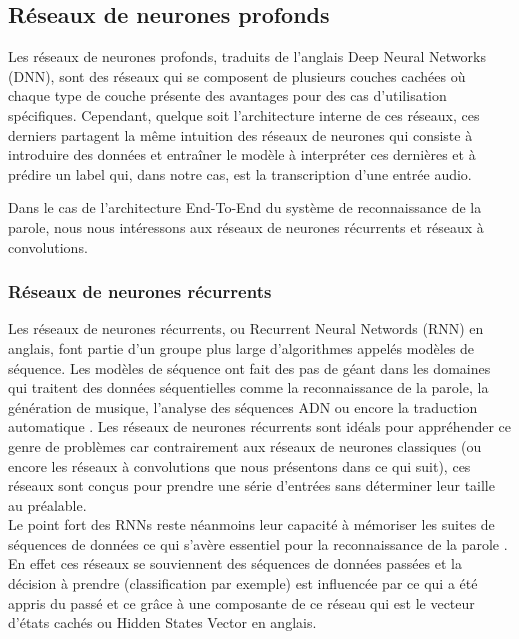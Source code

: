 \subsection{Réseaux de neurones profonds}
Les réseaux de neurones profonds, traduits de l'anglais Deep Neural Networks (DNN), sont des réseaux qui se composent de plusieurs couches cachées où chaque type de couche présente des avantages pour des cas d'utilisation spécifiques. Cependant, quelque soit l'architecture interne de ces réseaux, ces derniers partagent la même intuition des réseaux de neurones qui consiste à introduire des données et entraîner le modèle à interpréter ces dernières et à prédire un label qui, dans notre cas, est la transcription d'une entrée audio.

Dans le cas de l'architecture End-To-End du système de reconnaissance de la parole, nous nous intéressons aux réseaux de neurones récurrents et réseaux à convolutions.

\subsubsection{Réseaux de neurones récurrents}
Les réseaux de neurones récurrents, ou Recurrent Neural Networds (RNN) en anglais, font partie d'un groupe plus large d'algorithmes appelés modèles de séquence. Les modèles de séquence ont fait des pas de géant dans les domaines qui traitent des données séquentielles comme la reconnaissance de la parole, la génération de musique, l'analyse des séquences ADN ou encore la traduction automatique \cite{rnntowardsdata}. Les réseaux de neurones récurrents sont idéals pour appréhender ce genre de problèmes car contrairement aux réseaux de neurones classiques (ou encore les réseaux à convolutions que nous présentons dans ce qui suit), ces réseaux sont conçus pour prendre une série d'entrées sans déterminer leur taille au préalable. \\
Le point fort des RNNs reste néanmoins leur capacité à mémoriser les suites de séquences de données ce qui s'avère essentiel pour la reconnaissance de la parole \cite{rnnintro}. En effet ces réseaux se souviennent des séquences de données passées et la décision à prendre (classification par exemple) est influencée par ce qui a été appris du passé et ce grâce à une composante de ce réseau qui est le vecteur d'états cachés ou Hidden States Vector en anglais. 

